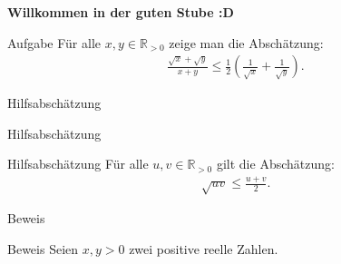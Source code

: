 \documentclass[10pt]{beamer}
\title{}
\author{Artur's Mathematikstübchen}
\date{}
\def\bR{\mathbb{R}}
\begin{document}

\begin{frame}
    \begin{center}
        \textbf{\huge Willkommen in der guten Stube \newline \newline :D}
    \end{center}
\end{frame}




\begin{frame}
    \begin{alertblock}{Aufgabe}
        Für alle \( x, y \in \bR_{> 0} \) zeige man die Abschätzung:
        \begin{align*}
            \frac{\sqrt{x} + \sqrt{y}}{x + y}
            \leq \frac{1}{2} \left( \frac{1}{\sqrt{x}} + \frac{1}{\sqrt{y}} \right).
        \end{align*}
    \end{alertblock}
\end{frame}



\begin{frame}{Hilfsabschätzung}
    
\end{frame}



\begin{frame}{Hilfsabschätzung}
    \begin{block}{Hilfsabschätzung}
        Für alle \( u, v \in \bR_{> 0} \) gilt die Abschätzung:
        \begin{align*}
            \sqrt{uv}
            \leq \frac{u + v}{2}.
        \end{align*}
    \end{block}
\end{frame}



\begin{frame}{Beweis}
    
\end{frame}



\begin{frame}{Beweis}
    Seien \( x, y > 0 \) zwei positive reelle Zahlen.
\end{frame}
\end{document}
